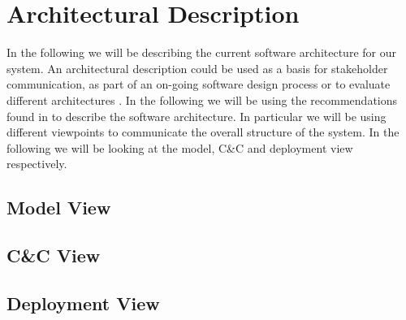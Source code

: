 \section{Architectural Description} %
\label{sec:Architectural Description}

In the following we will be describing the current software architecture for our system. An architectural description could be used as a basis for stakeholder communication, as part of an on-going software design process or to evaluate different architectures \cite{christensen}. In the following we will be using the recommendations found in \cite{christensen} to describe the software architecture. In particular we will be using different viewpoints to communicate the overall structure of the system. In the following we will be looking at the model, C\&C and deployment view respectively.

\subsection{Model View}

\subsection{C\&C View}

\subsection{Deployment View}

